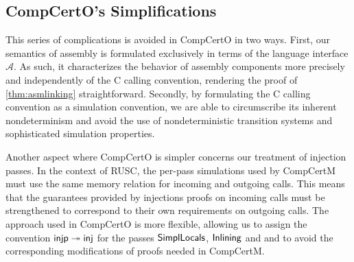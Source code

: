 \documentclass[sigplan,screen]{acmart}
\newenvironment{optional}{}{}
\begin{document}
\begin{optional}

\subsection{CompCertO's Simplifications} %

This series of complications
is avoided in CompCertO in two ways.
First,
our semantics of assembly
is formulated exclusively in terms of the language interface $\mathcal{A}$.
As such,
it characterizes the behavior of assembly components
more precisely and independently of the C calling convention,
rendering the proof of \autoref{thm:asmlinking} straightforward.
Secondly,
by formulating the C calling convention as a simulation convention,
we are able to circumscribe its inherent nondeterminism
and avoid the use of nondeterministic transition systems
and sophisticated simulation properties.

Another aspect where CompCertO is simpler
concerns our treatment of injection passes.
In the context of RUSC,
the per-pass simulations used by CompCertM
must use the same memory relation for incoming and outgoing calls.
This means that the guarantees provided by injections proofs
on incoming calls
must be strengthened to correspond to
their own requirements on outgoing calls.
The approach used in CompCertO
is more flexible,
allowing us to assign the convention
$ \mathsf{injp}  \twoheadrightarrow  \mathsf{inj} $
for the passes $ \mathsf{SimplLocals} $, $ \mathsf{Inlining} $
and 
and to avoid the corresponding modifications
of proofs needed in CompCertM.




\end{optional}
\end{document}
